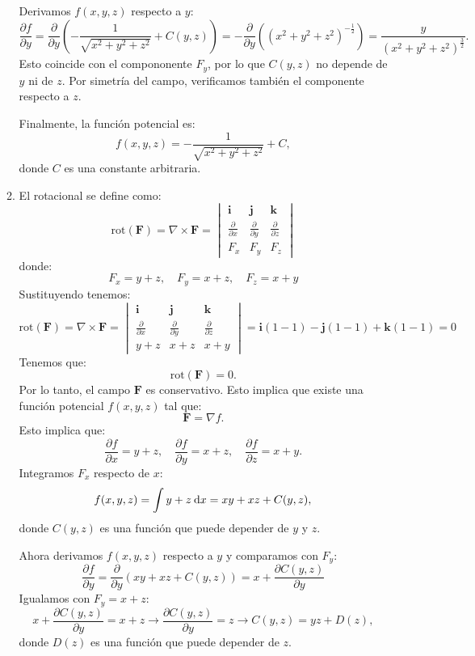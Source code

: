 \begin{enumerate}[label=\color{red}\textbf{\arabic*)}]
\begin{enumerate}[label=\color{red}\textbf{\alph*)}]
Derivamos  $f(x,y,z)$ respecto a  $y$: \[
\frac{\partial f}{\partial y} =\frac{\partial }{\partial y} \left( -\dfrac{1}{\sqrt{x^2+y^2+z^2} }+C(y,z) \right)=-\frac{\partial }{\partial y} \left( (x^2+y^2+z^2)^{-\frac{1}{2} } \right) =\dfrac{y}{(x^2+y^2+z^2)^{\frac{3}{2} }}.
\]
Esto coincide con el compononente $F_y$, por lo que  $C(y,z)$ no depende de  $y$ ni de  $z$. Por simetría del campo, verificamos también el componente respecto a  $z$.

Finalmente, la función potencial es:  \[
f(x,y,z)=-\dfrac{1}{\sqrt{x^2+y^2+z^2} }+C,
\] 
donde $C$ es una constante arbitraria.
    \item {} 

      El rotacional se define como: \[
      \mathrm{rot} (\mathbf{F} )=\nabla \times \mathbf{F} =\begin{vmatrix} 
        \mathbf{i} & \mathbf{j} & \mathbf{k} \\
        \frac{\partial }{\partial x} & \frac{\partial }{\partial y} & \frac{\partial }{\partial z} \\
        F_x & F_y & F_z
      \end{vmatrix} 
      \] 
      donde: \[
        F_x=y+z,\quad F_y=x+z, \quad F_z=x+y
      \] 
      Sustituyendo tenemos: \[
      \mathrm{rot} (\mathbf{F}) = \nabla \times \mathbf{F} =\begin{vmatrix} 
        \mathbf{i} & \mathbf{j} &\mathbf{k} \\
        \frac{\partial }{\partial x} & \frac{\partial }{\partial y} & \frac{\partial }{\partial z} \\
        y+z & x+z & x+y
      \end{vmatrix} = \mathbf{i} (1-1) -\mathbf{j} (1-1)+\mathbf{k}(1-1)=0
      \] 
      Tenemos que: \[
      \mathrm{rot} (\mathbf{F} )=0.
      \] 
      Por lo tanto, el campo $\mathbf{F} $ es conservativo. Esto implica que existe una función potencial $f(x,y,z)$ tal que: \[
      \mathbf{F} =\nabla f.
      \] 
      Esto implica que: \[
        \frac{\partial f}{\partial x} =y+z ,\quad \frac{\partial f}{\partial y} =x+z,\quad \frac{\partial f}{\partial z} =x+y.
      \] 
      Integramos $F_x$ respecto de $x$:  \[
      f(x,y,z)=\int y+z\:\mathrm{d}x =xy+xz + C(y,z),
      \] donde $C(y,z)$ es una función que puede depender de  $y$ y  $z$.

      Ahora derivamos $f(x,y,z)$ respecto a $y$ y comparamos con  $F_y$: \[
      \frac{\partial f}{\partial y} =\frac{\partial }{\partial y} \left( xy+xz+C(y,z) \right) =x+\frac{\partial C(y,z)}{\partial y} 
      \] 
      Igualamos con $F_y=x+z$:  \[
      x+\frac{\partial C(y,z)}{\partial y} =x+z\longrightarrow \frac{\partial C(y,z)}{\partial y} =z\longrightarrow C(y,z)=yz+D(z),
      \] 
donde $D(z)$ es una función que puede depender de $z$.


\end{enumerate}
\end{enumerate}
